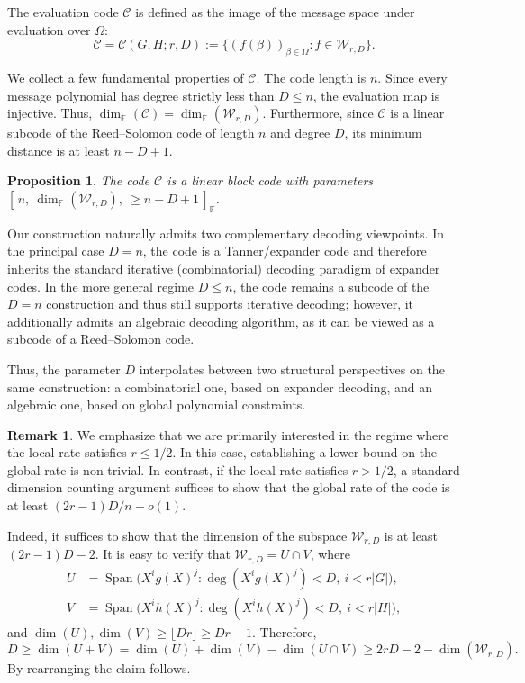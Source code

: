 \documentclass[11pt]{article}
\theoremstyle{plain}
\newtheorem{proposition}[theorem]{Proposition}
\theoremstyle{definition}
\newtheorem{remark}[theorem]{Remark}
\newcommand{\abs}[1]{\left|#1\right|}
\DeclareMathOperator{\Span}{Span}
\begin{document}
The evaluation code $\mathcal{C}$ is defined as the image of the message space under evaluation over $\Omega$:
\begin{equation}
    \label{eq:main-code-construction}    
    \mathcal{C} = \mathcal{C}(G,H; r,D) := \big\{ (f(\beta))_{\beta \in \Omega} : f \in \mathcal{W}_{r,D} \big\}.
\end{equation}

We collect a few fundamental properties of $\mathcal{C}$. The code length is $n$. Since every message polynomial has degree strictly less than $D \le n$, the evaluation map is injective. Thus, $\dim_\mathbb{F}(\mathcal{C}) = \dim_\mathbb{F}(\mathcal{W}_{r,D})$. Furthermore, since $\mathcal{C}$ is a linear subcode of the Reed--Solomon code of length $n$ and degree $D$, its minimum distance is at least $n - D + 1$.

\begin{proposition}
    The code $\mathcal{C}$ is a linear block code with parameters $[\,n,\ \dim_\mathbb{F}(\mathcal{W}_{r,D}),\ \ge n-D+1\,]_\mathbb{F}$.
\end{proposition}
Our construction naturally admits two complementary decoding viewpoints. In the principal case $D = n$, the code is a Tanner/expander code and therefore inherits the standard iterative (combinatorial) decoding paradigm of expander codes. In the more general regime $D \leq n$, the code remains a subcode of the $D = n$ construction and thus still supports iterative decoding; however, it additionally admits an algebraic decoding algorithm, as it can be viewed as a subcode of a Reed--Solomon code. 

Thus, the parameter $D$ interpolates between two structural perspectives on the same construction: a combinatorial one, based on expander decoding, and an algebraic one, based on global polynomial constraints.

\begin{remark}
\label{rem:counting-bound}
    We emphasize that we are primarily interested in the regime where the local rate satisfies $r \le 1/2$. In this case, establishing a lower bound on the global rate is non-trivial. In contrast, if the local rate satisfies $r > 1/2$, a standard dimension counting argument  suffices to show that the global rate of the code is at least $(2r-1)D/n -o(1)$.

    Indeed, it suffices to show that the dimension of the subspace $\mathcal{W}_{r,D}$ is at least $(2r-1)D-2$. 
    It is easy to verify that $\mathcal{W}_{r,D}=U\cap V$, where
    \[
    \begin{aligned}
    U&=\Span\big(X^ig(X)^j:\deg(X^ig(X)^j)<D,\ i<r\abs{G} \big), \\    V&=\Span\big(X^ih(X)^j:\deg(X^ih(X)^j)<D,\ i<r\abs{H} \big),
    \end{aligned}
    \]
    and 
    $\dim(U),\dim(V)\geq \lfloor Dr\rfloor\geq Dr-1$.  Therefore,
    $$D\geq \dim(U+V)=\dim(U)+\dim(V)-\dim(U\cap V)\geq 2rD-2-\dim(\mathcal{W}_{r,D}).$$
    By rearranging the claim follows. 
\end{remark}
\end{document}
